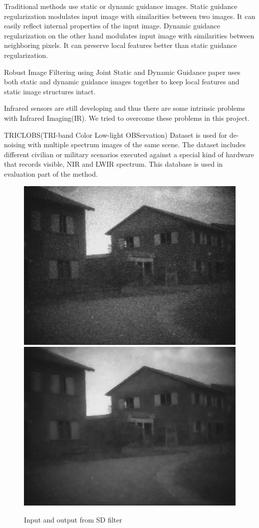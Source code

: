 \documentclass[10pt,twocolumn,letterpaper]{article}
\begin{document}
	Traditional methods use static or dynamic guidance images. Static guidance regularization modulates input image with similarities between two images. It can easily reflect internal properties of the input image.
	Dynamic guidance regularization on the other hand modulates input image with similarities between neighboring pixels. It can preserve local features better than static guidance regularization.
	
	Robust Image Filtering using Joint Static and Dynamic Guidance\cite{ham2015robust} paper uses both static and dynamic guidance images together to keep local features and static image structures intact.
	
	Infrared sensors are still developing and thus there are some intrinsic problems with Infrared Imaging(IR). We tried to overcome these problems in this project.
	
	TRICLOBS(TRI-band Color Low-light OBServation) Dataset\cite{triclobs} is used for de-noising with multiple spectrum images of the same scene. The dataset includes different civilian or military scenarios executed against a special kind of hardware that records visible, NIR and LWIR spectrum. This database is used in evaluation part of the method\cite{ham2015robust}.
	
	\begin{figure}
		\includegraphics[width=0.49\columnwidth]{images/TRI_A4/ch1.png}
		\includegraphics[width=0.49\columnwidth]{images/TRI_A4/ch1_ch3_15_3000_150.png}
		\caption{Input and output from SD filter}\label{fig:example-input-output}
	\end{figure}
	
\end{document}
